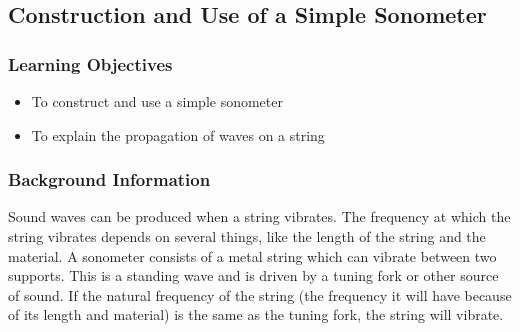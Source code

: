 	
	


\subsection{Construction and Use of a Simple Sonometer}

\subsubsection*{Learning Objectives}
\begin{itemize}
\item{To construct and use a simple sonometer} 
\item{To explain the propagation of waves on a string} 
\end{itemize}

\subsubsection*{Background Information}
Sound waves can be produced when a string vibrates. The frequency at which the string vibrates depends on several things, like the length of the string and the material. A sonometer consists of a metal string which can vibrate between two supports. This is a standing wave and is driven by a tuning fork or other source of sound. If the natural frequency of the string (the frequency it will have because of its length and material) is the same as the tuning fork, the string will vibrate.  

